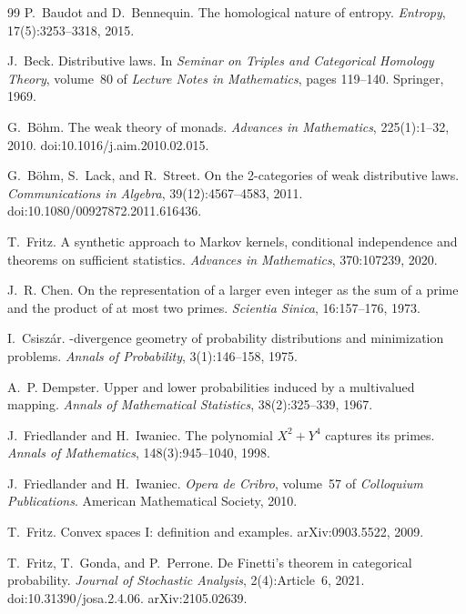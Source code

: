 \documentclass[11pt]{article}
\theoremstyle{definition}
\theoremstyle{remark}
\begin{document}
\begin{thebibliography}{99}
P.~Baudot and D.~Bennequin.
\newblock The homological nature of entropy.
\newblock \emph{Entropy}, 17(5):3253--3318, 2015.

J.~Beck.
\newblock Distributive laws.
\newblock In \emph{Seminar on Triples and Categorical Homology Theory}, volume~80 of \emph{Lecture
  Notes in Mathematics}, pages 119--140. Springer, 1969.

G.~B\"ohm.
\newblock The weak theory of monads.
\newblock \emph{Advances in Mathematics}, 225(1):1--32, 2010.
\newblock doi:10.1016/j.aim.2010.02.015.

G.~B\"ohm, S.~Lack, and R.~Street.
\newblock On the 2-categories of weak distributive laws.
\newblock \emph{Communications in Algebra}, 39(12):4567--4583, 2011.
\newblock doi:10.1080/00927872.2011.616436.

T.~Fritz.
\newblock A synthetic approach to {M}arkov kernels, conditional independence and theorems on
  sufficient statistics.
\newblock \emph{Advances in Mathematics}, 370:107239, 2020.

J.~R. Chen.
\newblock On the representation of a larger even integer as the sum of a prime and the product of at
  most two primes.
\newblock \emph{Scientia Sinica}, 16:157--176, 1973.

I.~Csisz\'ar.
-divergence geometry of probability distributions and minimization problems.
\newblock \emph{Annals of Probability}, 3(1):146--158, 1975.

A.~P. Dempster.
\newblock Upper and lower probabilities induced by a multivalued mapping.
\newblock \emph{Annals of Mathematical Statistics}, 38(2):325--339, 1967.

J.~Friedlander and H.~Iwaniec.
\newblock The polynomial {$X^2+Y^4$} captures its primes.
\newblock \emph{Annals of Mathematics}, 148(3):945--1040, 1998.

J.~Friedlander and H.~Iwaniec.
\newblock \emph{Opera de Cribro}, volume~57 of \emph{Colloquium Publications}.
\newblock American Mathematical Society, 2010.

T.~Fritz.
\newblock Convex spaces {I}: definition and examples.
\newblock arXiv:0903.5522, 2009.

T.~Fritz, T.~Gonda, and P.~Perrone.
\newblock De {F}inetti's theorem in categorical probability.
\newblock \emph{Journal of Stochastic Analysis}, 2(4):Article~6, 2021.
\newblock doi:10.31390/josa.2.4.06. arXiv:2105.02639.


\end{thebibliography}
\end{document}
